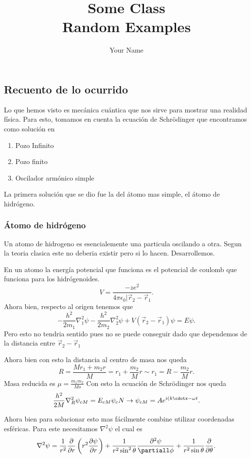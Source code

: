 \documentclass{report}
\title{\Huge{Some Class}\\Random Examples}
\author{\huge{Your Name}}
\date{}
\begin{document}
\maketitle
\newpage%
\tableofcontents
\pagebreak

\chapter{}
\section{Recuento de lo ocurrido}
Lo que hemos visto es mecánica cuántica que nos sirve para  mostrar una realidad física. Para esto, tomamos en cuenta la ecuación de Schr\"{o}dinger que encontramos como solución en 
\begin{enumerate}
  \item Pozo Infinito
  \item Pozo finito
  \item Oscilador armónico simple
\end{enumerate}
La primera solución que se dio fue la del átomo mas simple, el átomo de hidrógeno.
\subsection{Átomo de hidrógeno}
Un atomo de hidrogeno es esencialemente una particula oscilando a otra. Segun la teoria clasica este no deberia existir pero si lo hacen. Desarrollemos.

En un atomo la energía potencial que funciona es el potencial de coulomb que funciona para los hidrógenoides.
\begin{equation}
  V = \frac{-ze^2}{4\pi\epsilon_0|\Vec{r}_2-\Vec{r}_1}
.\end{equation}
Ahora bien, respecto al origen tenemos que 
\begin{equation}
  -\frac{h^2}{2m_1}\nabla^2_1 \psi - \frac{h^2}{2m_2}\nabla^2_2\psi+V(\Vec{r}_2-\Vec{r}_1)\psi=E\psi
.\end{equation}
Pero esto no tendria sentido pues no se puede conseguir dado que dependemos de la distancia entre $\Vec{r}_2-\Vec{r}_1$

Ahora bien con esto la distancia al centro de masa nos queda
 \begin{equation}
   R=\frac{Mr_1+m_2r}{M}=r_1+\frac{m_2}{M}r\sim r_1=R-\frac{m_2}{M}r
.\end{equation}
Masa reducida es $\mu = \frac{m_1m_2}{Mo}$ Con esto la ecuación de Schr\"{o}dinger nos queda \[
  \frac{h^2}{2M}\nabla_R^2 \psi_{cM}= E_{cM}\psi_cN \to \psi_{cM}=Ae^{i(k\cdotx-\omega t}
.\] 

Ahora bien para solucionar esto mas fácilmente combine utilizar coordenadas esféricas. Para este necesitamos $\nabla^2 \psi$ el cual es
\begin{equation}
  \nabla ^2 \psi = \frac{1}{r^2}\frac{\partial}{\partial r}\left( r^2\frac{ \partial\psi}{\partial r}  \right) + \frac{1}{r^2\sin^2\theta}\frac{\partial^2\psi}{\partiall\phi}+ \frac{1}{r^2\sin\theta}\frac{\partial}{\partial \theta} 
.\end{equation}
\end{document}
